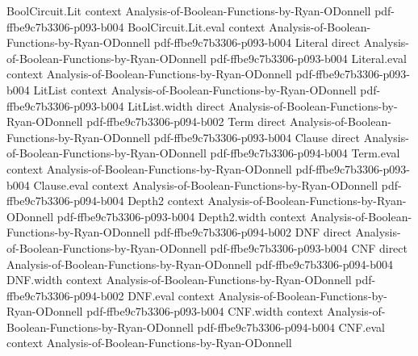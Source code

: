 \begin{lemma}
\label{LMN.compose_fiber_weight_eq}
\leanok
{}
\proofstep
  {BoolCircuit.Lit}
  {context}
  {Analysis-of-Boolean-Functions-by-Ryan-ODonnell}
  {pdf-ffbe9c7b3306-p093-b004}
\proofstep
  {BoolCircuit.Lit.eval}
  {context}
  {Analysis-of-Boolean-Functions-by-Ryan-ODonnell}
  {pdf-ffbe9c7b3306-p093-b004}
\proofstep
  {Literal}
  {direct}
  {Analysis-of-Boolean-Functions-by-Ryan-ODonnell}
  {pdf-ffbe9c7b3306-p093-b004}
\proofstep
  {Literal.eval}
  {context}
  {Analysis-of-Boolean-Functions-by-Ryan-ODonnell}
  {pdf-ffbe9c7b3306-p093-b004}
\proofstep
  {LitList}
  {context}
  {Analysis-of-Boolean-Functions-by-Ryan-ODonnell}
  {pdf-ffbe9c7b3306-p093-b004}
\proofstep
  {LitList.width}
  {direct}
  {Analysis-of-Boolean-Functions-by-Ryan-ODonnell}
  {pdf-ffbe9c7b3306-p094-b002}
\proofstep
  {Term}
  {direct}
  {Analysis-of-Boolean-Functions-by-Ryan-ODonnell}
  {pdf-ffbe9c7b3306-p093-b004}
\proofstep
  {Clause}
  {direct}
  {Analysis-of-Boolean-Functions-by-Ryan-ODonnell}
  {pdf-ffbe9c7b3306-p094-b004}
\proofstep
  {Term.eval}
  {context}
  {Analysis-of-Boolean-Functions-by-Ryan-ODonnell}
  {pdf-ffbe9c7b3306-p093-b004}
\proofstep
  {Clause.eval}
  {context}
  {Analysis-of-Boolean-Functions-by-Ryan-ODonnell}
  {pdf-ffbe9c7b3306-p094-b004}
\proofstep
  {Depth2}
  {context}
  {Analysis-of-Boolean-Functions-by-Ryan-ODonnell}
  {pdf-ffbe9c7b3306-p093-b004}
\proofstep
  {Depth2.width}
  {context}
  {Analysis-of-Boolean-Functions-by-Ryan-ODonnell}
  {pdf-ffbe9c7b3306-p094-b002}
\proofstep
  {DNF}
  {direct}
  {Analysis-of-Boolean-Functions-by-Ryan-ODonnell}
  {pdf-ffbe9c7b3306-p093-b004}
\proofstep
  {CNF}
  {direct}
  {Analysis-of-Boolean-Functions-by-Ryan-ODonnell}
  {pdf-ffbe9c7b3306-p094-b004}
\proofstep
  {DNF.width}
  {context}
  {Analysis-of-Boolean-Functions-by-Ryan-ODonnell}
  {pdf-ffbe9c7b3306-p094-b002}
\proofstep
  {DNF.eval}
  {context}
  {Analysis-of-Boolean-Functions-by-Ryan-ODonnell}
  {pdf-ffbe9c7b3306-p093-b004}
\proofstep
  {CNF.width}
  {context}
  {Analysis-of-Boolean-Functions-by-Ryan-ODonnell}
  {pdf-ffbe9c7b3306-p094-b004}
\proofstep
  {CNF.eval}
  {context}
  {Analysis-of-Boolean-Functions-by-Ryan-ODonnell}

\end{lemma}
